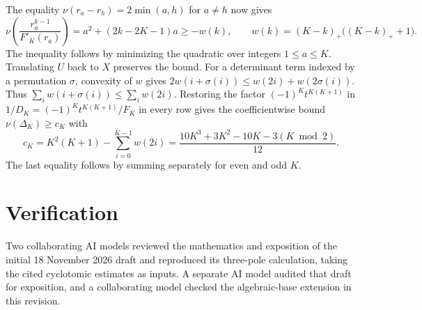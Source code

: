 \documentclass[11pt,letterpaper]{article}
\begin{document}
The equality \(\nu(r_a-r_h)=2\min(a,h)\) for \(a\ne h\) now gives
\[
 \nu\!\left(\frac{r_a^{k-1}}{F'_K(r_a)}\right)
 =a^2+(2k-2K-1)a\ge -w(k),\qquad
 w(k)=(K-k)_+\big((K-k)_++1\big).
\]
The inequality follows by minimizing the quadratic over integers
\(1\le a\le K\). Translating \(U\) back to \(X\) preserves the bound.
For a determinant term indexed by a permutation \(\sigma\), convexity
of \(w\) gives \(2w(i+\sigma(i))\le w(2i)+w(2\sigma(i))\). Thus
\(\sum_i w(i+\sigma(i))\le\sum_i w(2i)\). Restoring the factor
\((-1)^K t^{K(K+1)}\) in \(1/D_K=(-1)^K t^{K(K+1)}/F_K\) in every row
gives the coefficientwise bound \(\nu(\Delta_K)\ge c_K\) with
\begin{equation}\label{eq:base-exponent}
 c_K=K^2(K+1)-\sum_{i=0}^{K-1} w(2i)
    =\frac{10K^3+3K^2-10K-3(K\bmod 2)}{12}.
\end{equation}
The last equality follows by summing separately for even and odd \(K\).

\section*{Verification}
Two collaborating AI models reviewed the mathematics and exposition of the
initial 18 November 2026 draft and reproduced its three-pole calculation,
taking the cited cyclotomic estimates as inputs. A separate AI model
audited that draft for exposition, and a collaborating model checked the
algebraic-base extension in this revision.
\end{document}
